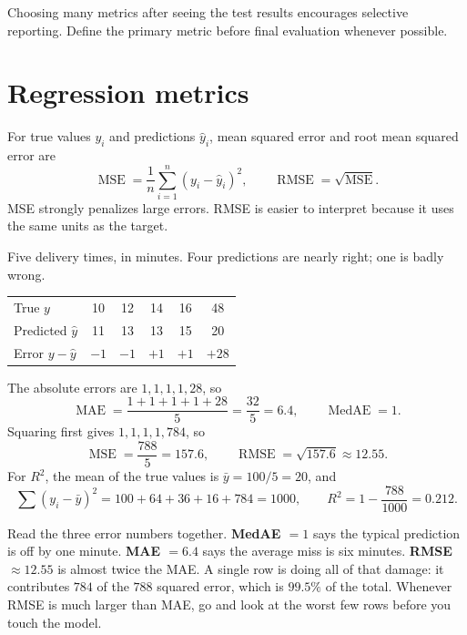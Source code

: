 Choosing many metrics after seeing the test results encourages selective reporting. Define the primary metric before final evaluation whenever possible.

\section{Regression metrics}
\label{sec:regression-metrics}

For true values $y_i$ and predictions $\hat{y}_i$, mean squared error and root mean squared error are
\[
  \operatorname{MSE}
  =\frac{1}{n}\sum_{i=1}^{n}{(y_i-\hat{y}_i)}^2,
  \qquad
  \operatorname{RMSE}=\sqrt{\operatorname{MSE}}.
\]
MSE strongly penalizes large errors. RMSE is easier to interpret because it uses the same units as the target.

\begin{workedexample}
Five delivery times, in minutes. Four predictions are nearly right; one is badly wrong.

\begin{mltable}\small
\begin{tabular}{lccccc}
\toprule
\rowcolor{MLPaleBlue!92}
True $y$            & 10 & 12 & 14 & 16 & 48 \\
Predicted $\hat{y}$ & 11 & 13 & 13 & 15 & 20 \\
Error $y-\hat{y}$   & $-1$ & $-1$ & $+1$ & $+1$ & $+28$ \\
\bottomrule
\end{tabular}
\end{mltable}

The absolute errors are $1,1,1,1,28$, so
\[
  \operatorname{MAE}=\frac{1+1+1+1+28}{5}=\frac{32}{5}=6.4,
  \qquad
  \operatorname{MedAE}=1.
\]
Squaring first gives $1,1,1,1,784$, so
\[
  \operatorname{MSE}=\frac{788}{5}=157.6,
  \qquad
  \operatorname{RMSE}=\sqrt{157.6}\approx 12.55.
\]
For $R^2$, the mean of the true values is $\bar{y}=100/5=20$, and
\[
  \sum{(y_i-\bar{y})}^2=100+64+36+16+784=1000,
  \qquad
  R^2=1-\frac{788}{1000}=0.212.
\]

Read the three error numbers together. \textbf{MedAE $=1$} says the typical prediction is off by one minute. \textbf{MAE $=6.4$} says the average miss is six minutes. \textbf{RMSE $\approx12.55$} is almost twice the MAE. A single row is doing all of that damage: it contributes $784$ of the $788$ squared error, which is $99.5\%$ of the total. Whenever RMSE is much larger than MAE, go and look at the worst few rows before you touch the model.
\end{workedexample}

